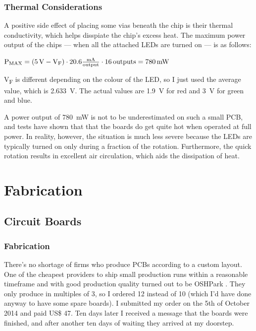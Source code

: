 \documentclass[a4paper, 11pt, titlepage]{report}
\newenvironment{ownmath}
{\vspace{2mm}\hspace{15pt}\begin{math}}
{\end{math}\vspace{2mm}}
\begin{document}
\subsection{Thermal Considerations}

A positive side effect of placing some vias beneath the chip is their thermal conductivity, which
helps disspiate the chip's excess heat. The maximum power output of the chips --- when all the
attached LEDs are turned on --- is as follows:

\begin{ownmath}
\textrm{P\textsubscript{MAX}} = (\SI{5}{\volt} - \textrm{V\textsubscript{F}}) \cdot
\num{20.6} \frac{\si{\milli\ampere}}{{\text{output}}} \cdot \SI{16}{outputs} = \SI{780}{\milli\watt}
\end{ownmath}

V\textsubscript{F} is different depending on the colour of the LED, so I just used the average
value, which is \SI{2.633}{\volt}. The actual values are \SI{1.9}{\volt} for red and \SI{3}{\volt}
for green and blue.

A power output of \SI{780}{\milli\watt} is not to be underestimated on such a small PCB, and tests
have shown that that the boards do get quite hot when operated at full power. In reality, however,
the situation is much less severe because the LEDs are typically turned on only during a fraction
of the rotation. Furthermore, the quick rotation results in excellent air circulation, which aids
the dissipation of heat.









\chapter{Fabrication}

\section{Circuit Boards}

\subsection{Fabrication}

There's no shortage of firms who produce PCBs according to a custom layout. One of the cheapest
providers to ship small production runs within a reasonable timeframe and with good production
quality turned out to be OSHPark \cite{oshpark}. They only produce in multiples of 3, so I ordered
12 instead of 10 (which I'd have done anyway to have some spare boards). I submitted my order on
the 5th of October 2014 and paid US\$ 47. Ten days later I received a message that the boards were
finished, and after another ten days of waiting they arrived at my doorstep.
\end{document}
